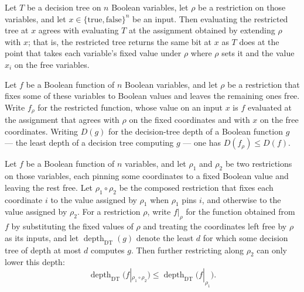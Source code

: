 \begin{theorem}
\label{LMN.dtRestrict_eval}
\leanok
{}
Let $T$ be a decision tree on $n$ Boolean variables, let $\rho$ be a restriction on
those variables, and let $x \in \{\mathrm{true},\mathrm{false}\}^n$ be an input. Then
evaluating the restricted tree at $x$ agrees with evaluating $T$ at the assignment
obtained by extending $\rho$ with $x$; that is, the restricted tree returns the same bit
at $x$ as $T$ does at the point that takes each variable's fixed value under $\rho$
where $\rho$ sets it and the value $x_i$ on the free variables.
\end{theorem}

\begin{theorem}
\label{LMN.dtDepth_restrictFn_le'}
\leanok
{}
Let $f$ be a Boolean function of $n$ Boolean variables, and let $\rho$ be a restriction
that fixes some of these variables to Boolean values and leaves the remaining ones free.
Write $f_\rho$ for the restricted function, whose value on an input $x$ is $f$ evaluated
at the assignment that agrees with $\rho$ on the fixed coordinates and with $x$ on the
free coordinates. Writing $D(g)$ for the decision-tree depth of a Boolean function $g$ —
the least depth of a decision tree computing $g$ — one has $D(f_\rho) \le D(f)$.
\end{theorem}

\begin{theorem}
\label{LMN.dtDepth_composeRestr_le}
\leanok
{}
Let $f$ be a Boolean function of $n$ variables, and let $\rho_1$ and $\rho_2$ be two
restrictions on those variables, each pinning some coordinates to a fixed Boolean value
and leaving the rest free. Let $\rho_1 \circ \rho_2$ be the composed restriction that
fixes each coordinate $i$ to the value assigned by $\rho_1$ when $\rho_1$ pins $i$, and
otherwise to the value assigned by $\rho_2$. For a restriction $\rho$, write $f|_{\rho}$
for the function obtained from $f$ by substituting the fixed values of $\rho$ and
treating the coordinates left free by $\rho$ as its inputs, and let
$\operatorname{depth}_{\mathrm{DT}}(g)$ denote the least $d$ for which some decision
tree of depth at most $d$ computes $g$. Then further restricting along $\rho_2$ can only
lower this depth:
\[
\operatorname{depth}_{\mathrm{DT}}\bigl(f|_{\rho_1 \circ \rho_2}\bigr) \le
\operatorname{depth}_{\mathrm{DT}}\bigl(f|_{\rho_1}\bigr).
\]
\end{theorem}

